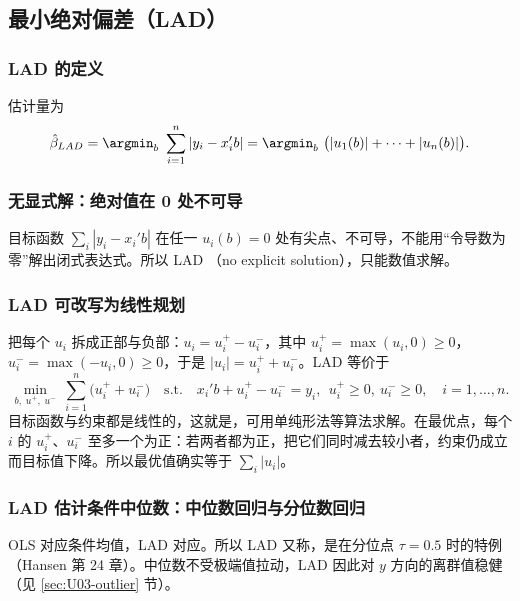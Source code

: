 \subsection{最小绝对偏差（LAD）}

\subsubsection{LAD 的定义}

\begin{defn}\label{def:U03-lad}
估计量为
\[
\hat\beta_{LAD}=\argmin_{b}\ \sum_{i=1}^n|y_i-x_i'b|=\argmin_b\ \big(|u_1(b)|+\cdots+|u_n(b)|\big).
\]
\end{defn}

\subsubsection{无显式解：绝对值在 0 处不可导}

目标函数 $\sum_i|y_i-x_i'b|$ 在任一 $u_i(b)=0$ 处有尖点、不可导，不能用“令导数为零”解出闭式表达式。所以 LAD （no explicit solution），只能数值求解。

\subsubsection{LAD 可改写为线性规划}

把每个 $u_i$ 拆成正部与负部：$u_i=u_i^+-u_i^-$，其中 $u_i^+=\max(u_i,0)\ge0$，$u_i^-=\max(-u_i,0)\ge0$，于是 $|u_i|=u_i^++u_i^-$。LAD 等价于
\[
\min_{b,\;u^+,\;u^-}\ \sum_{i=1}^n\big(u_i^++u_i^-\big)
\quad\text{s.t.}\quad x_i'b+u_i^+-u_i^-=y_i,\ \ u_i^+\ge0,\ u_i^-\ge0,\quad i=1,\dots,n .
\]
目标函数与约束都是线性的，这就是，可用单纯形法等算法求解。在最优点，每个 $i$ 的 $u_i^+$、$u_i^-$ 至多一个为正：若两者都为正，把它们同时减去较小者，约束仍成立而目标值下降。所以最优值确实等于 $\sum_i|u_i|$。

\subsubsection{LAD 估计条件中位数：中位数回归与分位数回归}

OLS 对应条件均值，LAD 对应。所以 LAD 又称，是在分位点 $\tau=0.5$ 时的特例（Hansen 第 24 章）。中位数不受极端值拉动，LAD 因此对 $y$ 方向的离群值稳健（见 \ref{sec:U03-outlier} 节）。

